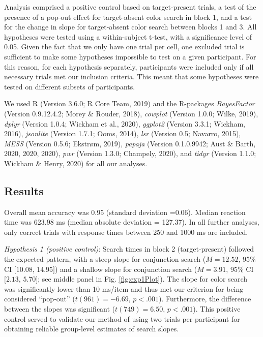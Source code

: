 \documentclass[
  english,
  man]{apa6}
\begin{document}
Analysis comprised a positive control based on target-present trials, a test of the presence of a pop-out effect for target-absent color search in block 1, and a test for the change in slope for target-absent color search between blocks 1 and 3. All hypotheses were tested using a within-subject t-test, with a significance level of 0.05.
Given the fact that we only have one trial per cell, one excluded trial is sufficient to make some hypotheses impossible to test on a given participant. For this reason, for each hypothesis separately, participants were included only if all necessary trials met our inclusion criteria. This meant that some hypotheses were tested on different subsets of participants.

We used R (Version 3.6.0; R Core Team, 2019) and the R-packages \emph{BayesFactor} (Version 0.9.12.4.2; Morey \& Rouder, 2018), \emph{cowplot} (Version 1.0.0; Wilke, 2019), \emph{dplyr} (Version 1.0.4; Wickham et al., 2020), \emph{ggplot2} (Version 3.3.1; Wickham, 2016), \emph{jsonlite} (Version 1.7.1; Ooms, 2014), \emph{lsr} (Version 0.5; Navarro, 2015), \emph{MESS} (Version 0.5.6; Ekstrøm, 2019), \emph{papaja} (Version 0.1.0.9942; Aust \& Barth, 2020, 2020, 2020), \emph{pwr} (Version 1.3.0; Champely, 2020), and \emph{tidyr} (Version 1.1.0; Wickham \& Henry, 2020) for all our analyses.

\hypertarget{results}{%
\subsection{Results}\label{results}}

Overall mean accuracy was 0.95 (standard deviation =0.06). Median reaction time was 623.98 ms (median absolute deviation = 127.37). In all further analyses, only correct trials with response times between 250 and 1000 ms are included.

\emph{Hypothesis 1 (positive control)}: Search times in block 2 (target-present) followed the expected pattern, with a steep slope for conjunction search (\(M = 12.52\), 95\% CI \([10.08\), \(14.95]\)) and a shallow slope for conjunction search (\(M = 3.91\), 95\% CI \([2.13\), \(5.70]\); see middle panel in Fig. \ref{fig:exp1Plot}). The slope for color search was significantly lower than 10 ms/item and thus met our criterion for being considered \enquote{pop-out} (\(t(961) = -6.69\), \(p < .001\)). Furthermore, the difference between the slopes was significant (\(t(749) = 6.50\), \(p < .001\)). This positive control served to validate our method of using two trials per participant for obtaining reliable group-level estimates of search slopes.
\end{document}
